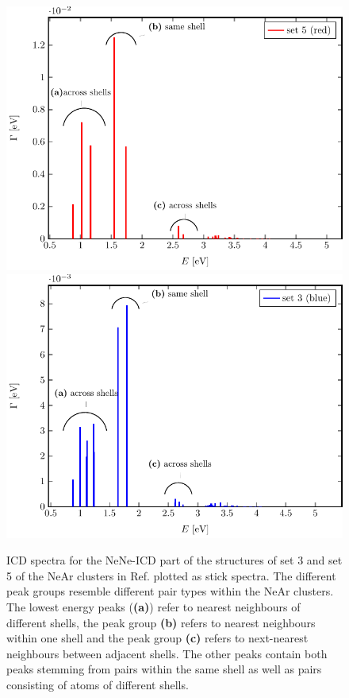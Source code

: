 \begin{figure}[h]
 \centering
 \includegraphics[width=0.7\columnwidth]{pics/rot.pdf}\\
 \includegraphics[width=0.7\columnwidth]{pics/blue.pdf}
 \caption{ICD spectra for the NeNe-ICD part of the structures of set 3 and
          set 5 of the NeAr clusters in Ref. \cite{Fasshauer14_1}
          plotted as stick spectra.
          The different peak groups resemble different pair types
          within the NeAr clusters. The lowest energy peaks (\textbf{(a)})
          refer to nearest neighbours
          of different shells, the peak group \textbf{(b)} refers
          to nearest neighbours within one shell and the peak group \textbf{(c)}
          refers to next-nearest neighbours between adjacent shells.
          The other peaks contain both peaks stemming from
          pairs within the same shell as well as pairs consisting of atoms
          of different shells.}
 \label{figure:rot_blue}
\end{figure}

